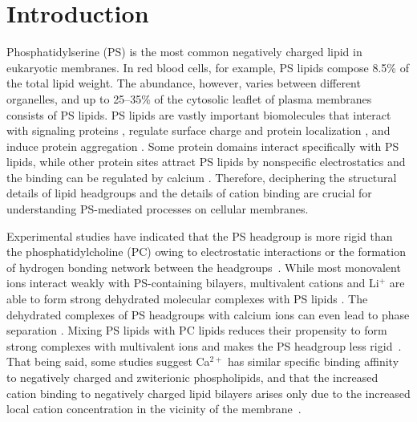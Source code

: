 \documentclass[aps,prl,superscriptaddress,twocolumn]{revtex4}
\begin{document}


\section{Introduction}
Phosphatidylserine (PS) is the most common negatively
charged lipid in eukaryotic membranes. In red blood cells, for example,
PS lipids compose 8.5\% of the total lipid weight. 
The abundance, however, varies between different organelles, and up to
25--35\% of the cytosolic leaflet of plasma membranes 
\cite{lemmon08,leventis10,li14} consists of PS lipids.
PS lipids are vastly important biomolecules that interact with
signaling proteins \cite{leventis10}, regulate
surface charge and protein localization \cite{yeung08}, and
induce protein aggregation \cite{zhao04,gorbenko06}.
Some protein domains interact specifically with PS lipids,
while other protein sites attract PS lipids by nonspecific electrostatics and the
binding can be regulated by calcium \cite{leventis10}.
Therefore, deciphering the structural details
of lipid headgroups and the details of cation binding
are crucial for understanding PS-mediated processes on cellular membranes.

Experimental studies have indicated that the
PS headgroup is more rigid than the phosphatidylcholine (PC)
owing to electrostatic interactions or the formation of hydrogen bonding network between the headgroups~\cite{browning80,buldt81}.
While most monovalent ions interact weakly with
PS-containing bilayers, multivalent cations and Li$^+$ are able to form strong
dehydrated molecular complexes with PS lipids \cite{hauser77,kurland79,eisenberg79,hauser83,dluhy83,hauser85,feigenson86,mattai89,roux90,roux91,boettcher11}.
The dehydrated complexes of PS headgroups with calcium ions can even lead to
phase separation \cite{hauser77,kurland79,hauser85,feigenson86,mattai89,roux90,roux91}. Mixing PS lipids with PC lipids reduces their propensity to form strong complexes with multivalent ions and makes the PS headgroup less rigid~\cite{browning80,buldt81,roux90,roux91}.
That being said, some studies suggest Ca$^{2+}$ has similar specific binding affinity 
to negatively charged and zwiterionic phospholipids, and that
the increased cation binding to negatively charged lipid bilayers arises only due
to the increased local cation concentration in the vicinity of the membrane~\cite{seelig90,sinn06}. 
\end{document}
